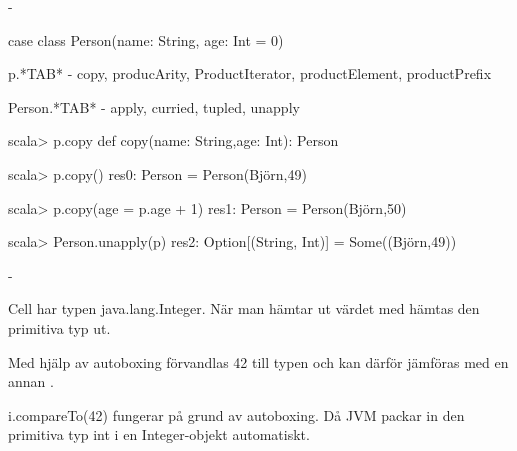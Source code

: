 

\ExerciseSolution{\ExeWeekELEVEN}

\BasicTasks %

\Task     %

\Subtask {}

\Subtask {}


\Task     %

\Subtask  {}

\Subtask  -

\Subtask  \begin{Code}
case class Person(name: String, age: Int = 0)
\end{Code}

\Subtask p.*TAB* - copy, producArity, ProductIterator, productElement, productPrefix

Person.*TAB* - apply, curried, tupled, unapply

\begin{REPLnonum}
scala> p.copy
   def copy(name: String,age: Int): Person

scala> p.copy()
res0: Person = Person(Björn,49)

scala> p.copy(age = p.age + 1)
res1: Person = Person(Björn,50)

scala> Person.unapply(p)
res2: Option[(String, Int)] = Some((Björn,49))
\end{REPLnonum}


\Task     %

\Subtask  -

\Subtask  Cell har typen java.lang.Integer. När man hämtar ut värdet med  hämtas den primitiva typ  ut.

\Subtask  Med hjälp av autoboxing förvandlas 42 till typen  och kan därför jämföras med en annan .

\Subtask  i.compareTo(42) fungerar på grund av autoboxing. Då JVM packar in den primitiva typ int i en Integer-objekt automatiskt.

